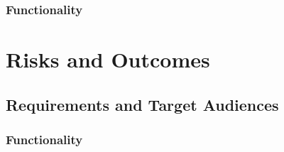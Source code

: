 \documentclass[paper=a4, fontsize=11pt]{scrartcl} %
\numberwithin{equation}{section} %
\numberwithin{figure}{section} %
\numberwithin{table}{section} %
\begin{document}

\subsubsection{Functionality}


\section{Risks and Outcomes}


\subsection{Requirements and Target Audiences}


\subsubsection{Functionality}
\end{document}
